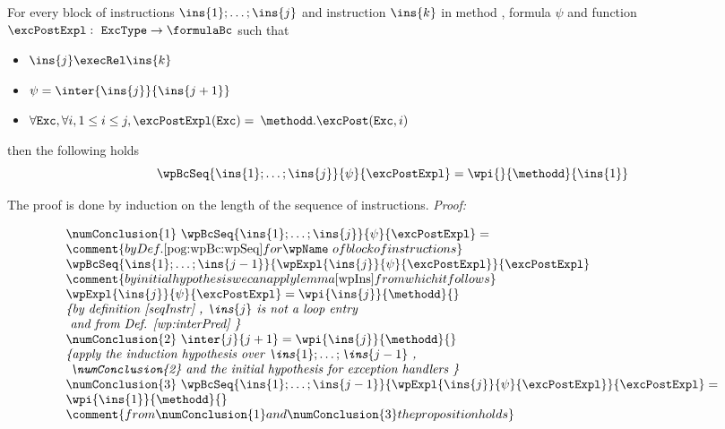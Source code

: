  \begin{wpBlock}\label{wpBlock}
  For every block of instructions $\ins{1}; \dots;\ins{j} $  and instruction $\ins{k}$  in  method \methodd,
  formula $\psi$ and function $\excPostExpl : \mbox{ \rm \texttt{ExcType}}  \rightarrow \formulaBc $  such that
 \begin{itemize} 
    \item $\ins{j} \execRel \ins{k}$
    \item  $\psi = \inter{\ins{j}}{\ins{j+1}}$

     \item $\forall \mbox{\rm\texttt{Exc}} ,  \forall i, 1 \le i \le j,  \excPostExpl( \mbox{\rm\texttt{Exc}} ) =$ 
                  $ \methodd.\excPost(\mbox{\rm\texttt{Exc}}, i ) $ 


   
\end{itemize}
then the following holds
     $$   \wpBcSeq{\ins{1}; \dots;\ins{j} }{\psi }{\excPostExpl} = \wpi{}{\methodd}{\ins{1} }$$        
\end{wpBlock} 

The proof is done by induction on the length of the sequence of instructions.
\textit{Proof:}

$$
\begin{array}{l}
  \numConclusion{1} \ \wpBcSeq{\ins{1}; \dots;\ins{j} }{\psi }{\excPostExpl} = \\
   \comment{by Def. \ref{pog:wpBc:wpSeq} for \wpName \ of block of instructions } \\
   \wpBcSeq{\ins{1}; \ldots;\ins{j -1 } }{\wpExpl{ \ins{j} }{ \psi }{ \excPostExpl}  }{\excPostExpl } \\
   \comment{by initial hypothesis we can apply lemma \ref{wpIns} from which it follows } \\
   \wpExpl{ \ins{j} }{ \psi }{ \excPostExpl}  = \wpi{\ins{j}}{\methodd}{} \\
   \mbox{\rm\textit{\{by definition \ref{seqInstr} ,  $\ins{j}$ is not a loop entry }} \\
   \mbox{\rm\textit{ and from Def. \ref{wp:interPred} \}}} \\
   \numConclusion{2} \ \inter{j}{j+1} =\wpi{\ins{j}}{\methodd}{} \\
   \mbox{\rm\textit{\{apply the induction hypothesis over $\ins{1}; \ldots;\ins{j -1 } $  , }}\\
   \mbox{\rm\textit{ \numConclusion{2} and the initial hypothesis for exception handlers \}}}\\
   \numConclusion{3} \ \wpBcSeq{\ins{1}; \dots;\ins{j -1 } }{\wpExpl{ \ins{j} }{ \psi }{ \excPostExpl}  }{\excPostExpl } = \\
   \wpi{\ins{1}}{\methodd}{} \\  
   \comment{from  \numConclusion{1} and \numConclusion{3} the proposition holds}
\end{array}
$$
\Qed \\


